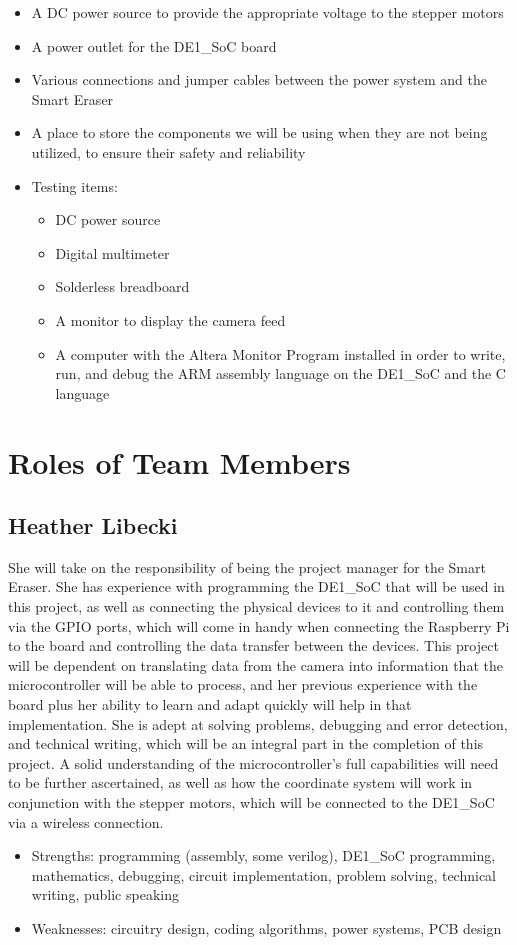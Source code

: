 \begin{itemize}
	\item A DC power source to provide the appropriate voltage to the stepper motors
	\item A power outlet for the DE1\_SoC board
	\item Various connections and jumper cables between the power system and the Smart Eraser
	\item A place to store the components we will be using when they are not being utilized, to ensure their safety and reliability
	\item Testing items:
	\begin{itemize}
		\item DC power source
		\item Digital multimeter
		\item Solderless breadboard
		\item A monitor to display the camera feed
		\item A computer with the Altera Monitor Program installed in order to write, run, and debug the ARM assembly language on the DE1\_SoC and the C language
	\end{itemize}
\end{itemize}

\section{Roles of Team Members}
\subsection{Heather Libecki}
She will take on the responsibility of being the project manager for the Smart Eraser. She has experience with programming the DE1\_SoC that will be used in this project, as well as connecting the physical devices to it and controlling them via the GPIO ports, which will come in handy when connecting the Raspberry Pi to the board and controlling the data transfer between the devices. This project will be dependent on translating data from the camera into information that the microcontroller will be able to process, and her previous experience with the board plus her ability to learn and adapt quickly will help in that implementation. She is adept at solving problems, debugging and error detection, and technical writing, which will be an integral part in the completion of this project. A solid understanding of the microcontroller\rq s full capabilities will need to be further ascertained, as well as how the coordinate system will work in conjunction with the stepper motors, which will be connected to the DE1\_SoC via a wireless connection.
\begin{itemize}
	\item Strengths: programming (assembly, some verilog), DE1\_SoC programming, mathematics, debugging, circuit implementation, problem solving, technical writing, public speaking
	\item Weaknesses: circuitry design, coding algorithms, power systems, PCB design 
\end{itemize} 
